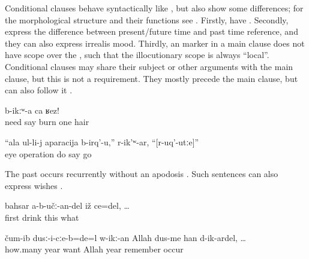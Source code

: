 Conditional clauses behave syntactically like , but also show some differences; for the morphological structure and their functions see . Firstly,  have . Secondly,  express the difference between present/future time and past time reference, and they can also express irrealis mood. Thirdly, an  marker in a main clause does not have scope over the  , such that the illocutionary scope is always ``local''. Conditional clauses may share their subject or other arguments with the main clause, but this is not a requirement. They mostly precede the main clause, but can also follow it .
%
\begin{exe}
	\ex	\label{ex:‎‎‎If you need me, burn one hair}
		b-ikːʷ-a	ca	ʁez!\\
			need	say	burn	one	hair\\
	\glt	{}

	\ex	\label{ex:‎‎‎(They) will operate your eye, she said, if you go (to the doctor)}
	\gll	``ala	ul-li-j	aparacija	b-irq'-u,''	r-ik'ʷ-ar,	``[r-uq'-utːe]''\\
			eye	operation	do	\tsc{f-}say	go\\
	\glt	{}
\end{exe}

The past  occurs recurrently without an apodosis . Such sentences can also express wishes .
%
\begin{exe}
	\ex	\label{ex:‎if he did not drink first}
	\gll	bahsar	a-b-učː-an-del	iž	ce=del, \ldots	\\
		first	drink	this	what\\
	\glt	{}

	\ex	\label{ex:‎‎‎In which year it was, beloved Allah, if I would remember the years}
	\gll	čum-ib	dusː-i-cːe-b=de=l	w-ikː-an	Allah	dus-me	han	d-ik-ardel, \ldots\\
		how.many	year	want	Allah	year	remember	occur\\
	\glt	{}
\end{exe}

